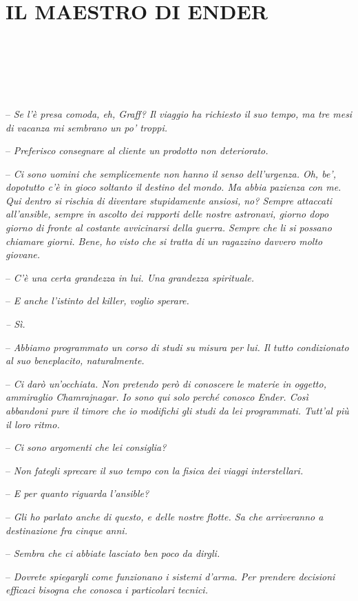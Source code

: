 \chapter{IL MAESTRO DI ENDER}

{~}

{~}

{~}

{-- \emph{Se l'è presa comoda, eh, Graff? Il viaggio ha richiesto il suo
		tempo, ma tre mesi di vacanza mi sembrano un po' troppi.}}

{-- \emph{Preferisco consegnare al cliente un prodotto non
		deteriorato.}}

{-- \emph{Ci sono uomini che semplicemente non hanno il senso
		dell'urgenza. Oh, be', dopotutto c'è in gioco soltanto il destino del
		mondo. Ma abbia pazienza con me. Qui dentro si rischia di diventare
		stupidamente ansiosi, no? Sempre attaccati all'ansible, sempre in
		ascolto dei rapporti delle nostre astronavi, giorno dopo giorno di
		fronte al costante avvicinarsi della guerra. Sempre che li si possano
		chiamare giorni. Bene, ho visto che si tratta di un ragazzino davvero
		molto giovane.}}

{-- \emph{C'è una certa grandezza in lui. Una grandezza spirituale.}}

{-- \emph{E anche l'istinto del killer, voglio sperare.}}

\emph{{-- Sì.}}

{-- \emph{Abbiamo programmato un corso di studi su misura per lui. Il
		tutto condizionato al suo beneplacito, naturalmente.}}

{-- \emph{Ci darò un'occhiata. Non pretendo però di conoscere le materie
		in oggetto, ammiraglio Chamrajnagar. Io sono qui solo perché conosco
		Ender. Così abbandoni pure il timore che io modifichi gli studi da lei
		programmati. Tutt'al più il loro ritmo.}}

{-- \emph{Ci sono argomenti che lei consiglia?}}

{-- \emph{Non fategli sprecare il suo tempo con la fisica dei viaggi
		interstellari.}}

{-- \emph{E per quanto riguarda l'ansible?}}

{-- \emph{Gli ho parlato anche di questo, e delle nostre flotte. Sa che
		arriveranno a destinazione fra cinque anni.}}

{-- \emph{Sembra che ci abbiate lasciato ben poco da dirgli.}}

{-- \emph{Dovrete spiegargli come funzionano i sistemi d'arma. Per
		prendere decisioni efficaci bisogna che conosca i particolari tecnici.}}

